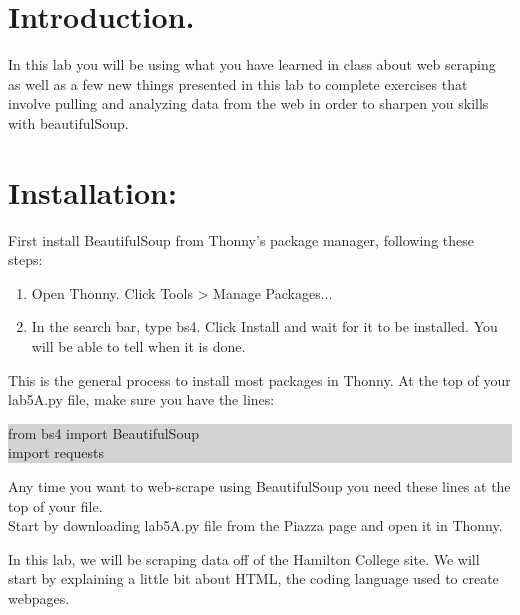 \documentclass[11pt, letterpaper, onecolumn, oneside, final]{article}
\begin{document}
\maketitle

\section{Introduction.} In this lab you will be using what you have learned in class about web scraping as well as a few new things presented in this lab to complete exercises that involve pulling and analyzing data from the web in order to sharpen you skills with {\consolas beautifulSoup}.

\section{Installation:}
    First install {\consolas BeautifulSoup} from Thonny's package manager, following these steps:
\begin{enumerate}
    \item Open Thonny. Click {\consolas Tools > Manage Packages...}
    \item In the search bar, type {\consolas bs4}. Click {\consolas Install} and wait for it to be installed. You will be able to tell when it is done.
\end{enumerate}
This is the general process to install most packages in Thonny. At the top of your {\consolas lab5A.py} file, make sure you have the lines:
\begin{center}
\colorbox{lightgray}{\parbox{.4\textwidth}{\consolas from bs4 import BeautifulSoup\\
import requests}}
\end{center}
Any time you want to web-scrape using {\consolas BeautifulSoup} you need these lines at the top of your file. \\
Start by  downloading {\consolas lab5A.py} file from the Piazza page and open it in Thonny.

    \item In this lab, we will be scraping data off of the Hamilton College site. We will start by explaining a little bit about HTML, the coding language used to create webpages.
    \\
    
    
    
\end{document}
